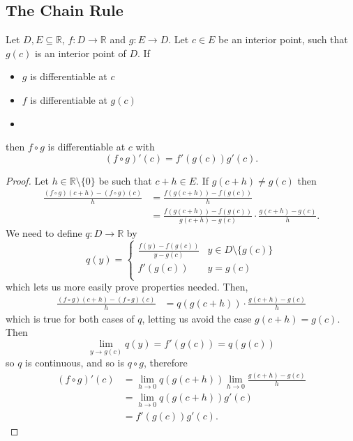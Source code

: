 \subsection{The Chain Rule}
\begin{theorem}
    Let $D, E \subseteq \mathbb{R}$, $f : D \rightarrow \mathbb{R}$ and $g : E \rightarrow D$. Let $c \in E$ be an interior point, such that $g(c)$ is an interior point of $D$. If
    \begin{itemize}
      \item $g$ is differentiable at $c$
      \item $f$ is differentiable at $g(c)$      \item 
    \end{itemize}
     then $f \circ g$ is differentiable at $c$ with
     \[(f \circ g)'(c) = f'(g(c))g'(c).\]

\end{theorem}
\begin{proof}
  Let $h \in \mathbb{R} \setminus \{0\}$ be such that $c + h \in E$. If $g(c + h) \not = g(c)$ then
  \begin{align*}
    \frac{(f \circ g)(c + h) - (f \circ g)(c)}{h} &= \frac{f(g(c + h)) - f(g(c))}{h} \\
      &= \frac{f(g(c+h)) - f(g(c))}{g(c + h) - g(c)} \cdot \frac{g (c+h)- g(c)}{h}
  .\end{align*}
  We need to define $q : D \rightarrow \mathbb{R}$ by
  \[q(y) = \left\{\begin{array}{lr}
      \frac{f(y) - f(g(c))}{y - g(c)} & y \in D \setminus \{g(c)\}\\
  f'(g(c)) & y = g(c)\\
  \end{array} \right.\]
  which lets us more easily prove properties needed. Then, 
  \begin{align*}
    \frac{(f \circ g)(c + h) - (f \circ g)(c)}{h} &= q(g(c + h)) \cdot \frac{g(c + h) - g(c)}{h}
  \end{align*}
  which is true for both cases of $q$, letting us avoid the case $g(c+h) = g(c)$. Then 
  \[\lim_{y \rightarrow g(c)} q(y) = f'(g(c)) = q(g(c))\]
  so $q$ is continuous, and so is $q \circ g$, therefore
  \begin{align*}
    ( f \circ g)'(c) &= \lim_{h \rightarrow 0} q(g(c + h)) \lim_{h \rightarrow 0} \frac{g(c + h) - g(c)}{h} \\
                     &= \lim_{h \rightarrow 0} q(g(c + h)) g'(c) \\
                     &= f'(g(c)) g'(c)
  .\end{align*}
\end{proof}

